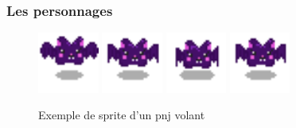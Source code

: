 \documentclass{article}
\begin{document}
\subsubsection{Les personnages}
\begin{figure}[h]
    \centering
    \includegraphics[height = 2cm]{py/idle_0.png}
    \includegraphics[height = 2cm]{py/idle_1.png}
    \includegraphics[height = 2cm]{py/idle_2.png}
    \includegraphics[height = 2cm]{py/idle_3.png}
    \caption{Exemple de sprite d'un pnj volant}
\end{figure}
\end{document}
